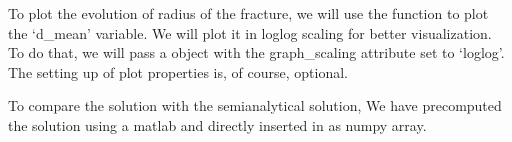 \documentclass[letterpaper,10pt,english]{sphinxmanual}
\begin{document}
\begin{sphinxVerbatim}[commandchars=\\\{\}]
   

   
\end{sphinxVerbatim}

\sphinxAtStartPar
To plot the evolution of radius of the fracture, we will use the  function to plot the ‘d\_mean’ variable. We will plot it in loglog scaling for better visualization. To do that, we will pass a  object with the graph\_scaling attribute set to ‘loglog’. The setting up of plot properties is, of course, optional.

\begin{sphinxVerbatim}[commandchars=\\\{\}]
  
  
\end{sphinxVerbatim}

\sphinxAtStartPar
To compare the solution with the semi\sphinxhyphen{}analytical solution, We have precomputed the solution using a matlab  and directly inserted in as numpy array.
\end{document}
